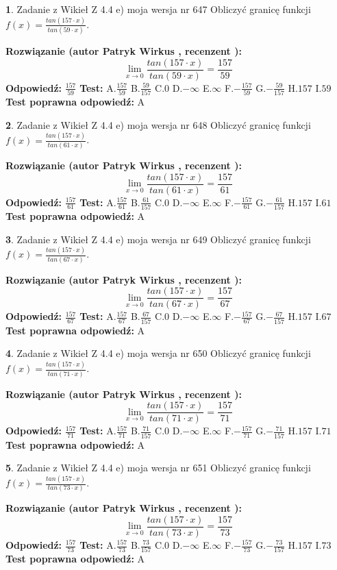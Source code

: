 \documentclass[12pt, a4paper]{article}
\theoremstyle{definition} %
\newtheorem{zad}{}
\newcommand{\zadStart}[1]{\begin{zad}#1\newline}
\newcommand{\zadStop}{\end{zad}}
\newcommand{\rozwStart}[2]{\noindent \textbf{Rozwiązanie (autor #1 , recenzent #2): }\newline}
\newcommand{\rozwStop}{\newline}
\newcommand{\odpStart}{\noindent \textbf{Odpowiedź:}\newline}
\newcommand{\odpStop}{\newline}
\newcommand{\testStart}{\noindent \textbf{Test:}\newline}
\newcommand{\testStop}{\newline}
\newcommand{\kluczStart}{\noindent \textbf{Test poprawna odpowiedź:}\newline}
\newcommand{\kluczStop}{\newline}
\begin{document}
\zadStart{Zadanie z Wikieł Z 4.4 e) moja wersja nr 647}
Obliczyć granicę funkcji $f(x)=\frac{tan(157\cdot x)}{tan(59\cdot x)}$.
\zadStop
\rozwStart{Patryk Wirkus}{}
$$\lim\limits_{x\to 0}\frac{tan(157\cdot x)}{tan(59\cdot x)}=
\frac{157}{59}$$
\rozwStop
\odpStart
$\frac{157}{59}$
\odpStop
\testStart
A.$\frac{157}{59}$
B.$\frac{59}{157}$
C.$0$
D.$-\infty$
E.$\infty$
F.$-\frac{157}{59}$
G.$-\frac{59}{157}$
H.$157$
I.$59$
\testStop
\kluczStart
A
\kluczStop



\zadStart{Zadanie z Wikieł Z 4.4 e) moja wersja nr 648}
Obliczyć granicę funkcji $f(x)=\frac{tan(157\cdot x)}{tan(61\cdot x)}$.
\zadStop
\rozwStart{Patryk Wirkus}{}
$$\lim\limits_{x\to 0}\frac{tan(157\cdot x)}{tan(61\cdot x)}=
\frac{157}{61}$$
\rozwStop
\odpStart
$\frac{157}{61}$
\odpStop
\testStart
A.$\frac{157}{61}$
B.$\frac{61}{157}$
C.$0$
D.$-\infty$
E.$\infty$
F.$-\frac{157}{61}$
G.$-\frac{61}{157}$
H.$157$
I.$61$
\testStop
\kluczStart
A
\kluczStop



\zadStart{Zadanie z Wikieł Z 4.4 e) moja wersja nr 649}
Obliczyć granicę funkcji $f(x)=\frac{tan(157\cdot x)}{tan(67\cdot x)}$.
\zadStop
\rozwStart{Patryk Wirkus}{}
$$\lim\limits_{x\to 0}\frac{tan(157\cdot x)}{tan(67\cdot x)}=
\frac{157}{67}$$
\rozwStop
\odpStart
$\frac{157}{67}$
\odpStop
\testStart
A.$\frac{157}{67}$
B.$\frac{67}{157}$
C.$0$
D.$-\infty$
E.$\infty$
F.$-\frac{157}{67}$
G.$-\frac{67}{157}$
H.$157$
I.$67$
\testStop
\kluczStart
A
\kluczStop



\zadStart{Zadanie z Wikieł Z 4.4 e) moja wersja nr 650}
Obliczyć granicę funkcji $f(x)=\frac{tan(157\cdot x)}{tan(71\cdot x)}$.
\zadStop
\rozwStart{Patryk Wirkus}{}
$$\lim\limits_{x\to 0}\frac{tan(157\cdot x)}{tan(71\cdot x)}=
\frac{157}{71}$$
\rozwStop
\odpStart
$\frac{157}{71}$
\odpStop
\testStart
A.$\frac{157}{71}$
B.$\frac{71}{157}$
C.$0$
D.$-\infty$
E.$\infty$
F.$-\frac{157}{71}$
G.$-\frac{71}{157}$
H.$157$
I.$71$
\testStop
\kluczStart
A
\kluczStop



\zadStart{Zadanie z Wikieł Z 4.4 e) moja wersja nr 651}
Obliczyć granicę funkcji $f(x)=\frac{tan(157\cdot x)}{tan(73\cdot x)}$.
\zadStop
\rozwStart{Patryk Wirkus}{}
$$\lim\limits_{x\to 0}\frac{tan(157\cdot x)}{tan(73\cdot x)}=
\frac{157}{73}$$
\rozwStop
\odpStart
$\frac{157}{73}$
\odpStop
\testStart
A.$\frac{157}{73}$
B.$\frac{73}{157}$
C.$0$
D.$-\infty$
E.$\infty$
F.$-\frac{157}{73}$
G.$-\frac{73}{157}$
H.$157$
I.$73$
\testStop
\kluczStart
A
\kluczStop
\end{document}
